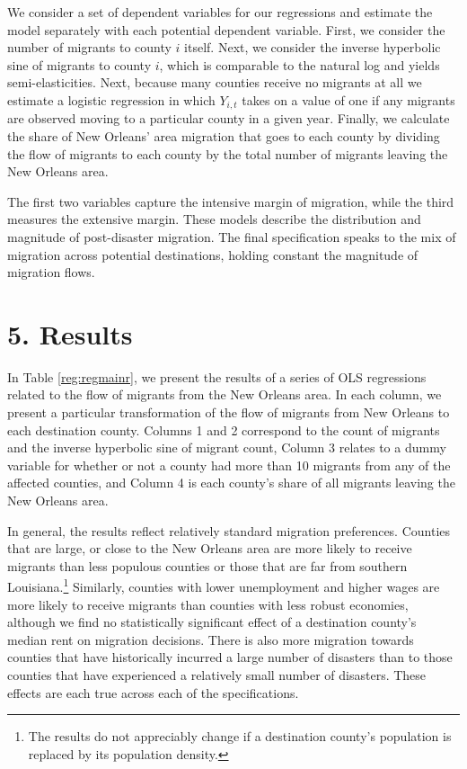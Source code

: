 \documentclass[]{article}
\begin{document}
We consider a set of dependent variables for our regressions and
estimate the model separately with each potential dependent variable.
First, we consider the number of migrants to county \(i\) itself. Next,
we consider the inverse hyperbolic sine of migrants to county \(i\),
which is comparable to the natural log and yields semi-elasticities.
Next, because many counties receive no migrants at all we estimate a
logistic regression in which \(Y_{i,t}\) takes on a value of one if any
migrants are observed moving to a particular county in a given year.
Finally, we calculate the share of New Orleans' area migration that goes
to each county by dividing the flow of migrants to each county by the
total number of migrants leaving the New Orleans area.

The first two variables capture the intensive margin of migration, while
the third measures the extensive margin. These models describe the
distribution and magnitude of post-disaster migration. The final
specification speaks to the mix of migration across potential
destinations, holding constant the magnitude of migration flows.

\section{\texorpdfstring{5. Results
\label{sec:results}}{5. Results }}\label{results}


In Table \ref{reg:regmainr}, we present the results of a series of OLS
regressions related to the flow of migrants from the New Orleans area.
In each column, we present a particular transformation of the flow of
migrants from New Orleans to each destination county. Columns 1 and 2
correspond to the count of migrants and the inverse hyperbolic sine of
migrant count, Column 3 relates to a dummy variable for whether or not a
county had more than 10 migrants from any of the affected counties, and
Column 4 is each county's share of all migrants leaving the New Orleans
area.

In general, the results reflect relatively standard migration
preferences. Counties that are large, or close to the New Orleans area
are more likely to receive migrants than less populous counties or those
that are far from southern Louisiana.\footnote{The results do not
  appreciably change if a destination county's population is replaced by
  its population density.} Similarly, counties with lower unemployment
and higher wages are more likely to receive migrants than counties with
less robust economies, although we find no statistically significant
effect of a destination county's median rent on migration decisions.
There is also more migration towards counties that have historically
incurred a large number of disasters than to those counties that have
experienced a relatively small number of disasters. These effects are
each true across each of the specifications.
\end{document}

